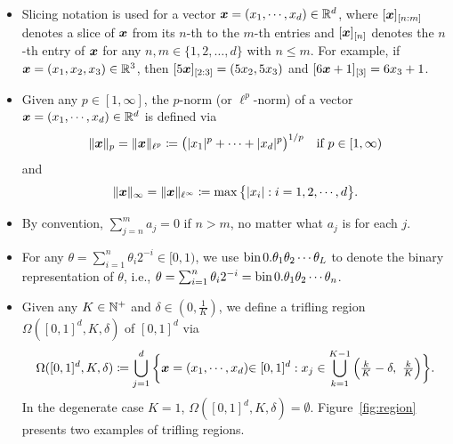 \documentclass[nohyperref]{article}
\theoremstyle{plain}
\theoremstyle{definition}
\theoremstyle{remark}
\begin{document}
\begin{itemize}
	
		\item Slicing notation is used for a  vector $\bmx=(x_1,\dotsc,x_d)\in\R^d$,  where $[{\bm{x}}]_{[n:m]}$ denotes a slice of ${\bm{x}}$ from its $n$-th to the $m$-th entries and  $[{\bm{x}}]_{[n]}$ denotes the $n$-th entry of ${\bm{x}}$ for any $n,m\in \{1,2,\dotsc,d\}$ with $n\le m$. For example, if $\bmx=(x_1,x_2,x_3)\in\R^3$, then $[5{\bm{x}}]_{[2:3]}=(5x_2,5x_3)$ and $[6{\bm{x}}+1]_{[3]}=6x_3+1$.
	
	\item Given any $p\in [1,\infty]$, the $p$-norm (or $\ell^p$-norm) of a vector $\bmx=(x_1,\dotsc,x_d)\in\R^d$ is defined via
	\begin{equation*}
		\|{\bm{x}}\|_p=\|{\bm{x}}\|_{\ell^p}\coloneqq \big(|x_1|^p+\mathinner{\mkern-0.1mu\cdotp\mkern-0.3mu\cdotp\mkern-0.3mu\cdotp\mkern-0.1mu}+|x_d|^p\big)^{1/p}\quad \textnormal{if $p\in [1,\infty)$}
	\end{equation*}
and
 \begin{equation*}		\|\bmx\|_{\infty}=\|\bmx\|_{\ell^\infty}\coloneqq \max\big\{|x_i|: i=1,2,\dotsc,d\big\}.
	\end{equation*}
	
	\item By convention, $\sum_{j=n}^{m} a_j=0$
	if $n>m$, no matter what $a_j$ is for each $j$.
	
	\item For any $\theta= \sum_{i=1}^{n}\theta_i 2^{-i}\in[0,1)$, we use $\textnormal{bin}\hspace{1.5pt} 0.\theta_1\theta_2\mathinner{\mkern-0.1mu\cdotp\mkern-0.3mu\cdotp\mkern-0.3mu\cdotp\mkern-0.1mu} \theta_L$ to denote the binary representation of $\theta$, i.e., $\theta=\sum_{i=1}^{n}\theta_i2^{-i}=\textnormal{bin}\hspace{1.5pt} 0.\theta_1\theta_2\mathinner{\mkern-0.1mu\cdotp\mkern-0.3mu\cdotp\mkern-0.3mu\cdotp\mkern-0.1mu} \theta_n$. 
	
	\item 
	Given any $K\in \N^+$ and $\delta\in (0, \tfrac{1}{K})$, we define a trifling region  $\Omega([0,1]^d,K,\delta)$ of $[0,1]^d$ via
	\begin{equation}
		\label{eq:triflingRegionDef}
		\Omega([0,1]^d,K,\delta)\coloneqq\bigcup_{j=1}^{d} \bigg\{\bmx=(x_1,\dotsc,x_d)\black{\in [0,1]^d}: x_j\in \bigcup_{k=1}^{K-1}\Big(\tfrac{k}{K}-\delta,\   \tfrac{k}{K}\Big)\bigg\}.
	\end{equation}
	In the degenerate case $K=1$, $\Omega([0,1]^d,K,\delta)=\emptyset$. 
 Figure~\ref{fig:region} presents two examples of trifling regions.
	

\end{itemize}
\end{document}
